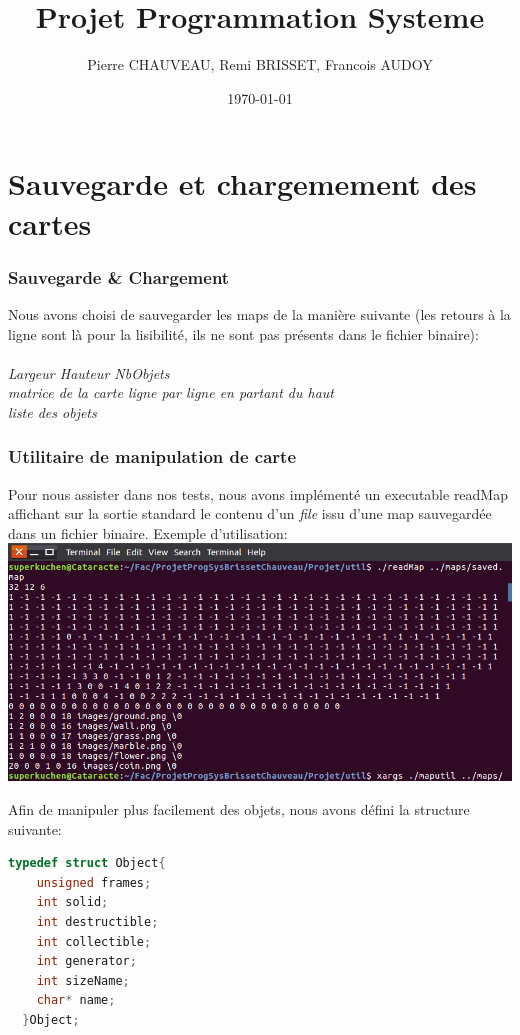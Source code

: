\documentclass[a4paper]{article}
\title{Projet Programmation Systeme}
\author{Pierre CHAUVEAU, Remi BRISSET, Francois AUDOY}
\date{\today} %
\begin{document}
\maketitle

\part{Sauvegarde et chargemement des cartes}

\section{Sauvegarde \& Chargement}
Nous avons choisi de sauvegarder les maps de la manière suivante (les retours à la ligne sont là pour la lisibilité, ils ne sont pas présents dans le fichier binaire): \\ \\
\emph{Largeur Hauteur NbObjets \\
matrice de la carte ligne par ligne en partant du haut\\
liste des objets}\\

\section{Utilitaire de manipulation de carte}
Pour nous assister dans nos tests, nous avons implémenté un executable readMap affichant sur la sortie standard le contenu d'un \emph{file} issu d'une map sauvegardée dans un fichier binaire.
Exemple d'utilisation: \\
\includegraphics[scale=0.5]{readMap.png} 

Afin de manipuler plus facilement des objets, nous avons défini la structure suivante:
\begin{lstlisting}[language=c]
  typedef struct Object{
    unsigned frames;
    int solid;
    int destructible;
    int collectible;
    int generator;
    int sizeName;
    char* name;
  }Object;
\end{lstlisting}
\end{document}
